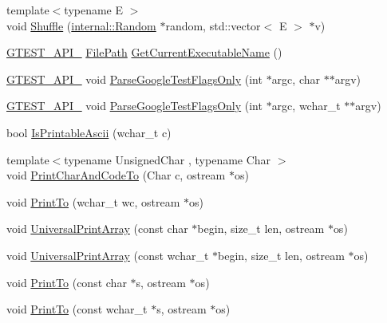\begin{DoxyCompactItemize}
{\footnotesize template$<$typename E $>$ }\\void \hyperlink{namespacetesting_1_1internal_a90d9e6ffe8522a7eb1b2ce9b1a0c4673}{Shuffle} (\hyperlink{classtesting_1_1internal_1_1_random}{internal\+::\+Random} $\ast$random, std\+::vector$<$ E $>$ $\ast$v)
\item 
\hyperlink{gtest-port_8h_aa73be6f0ba4a7456180a94904ce17790}{G\+T\+E\+S\+T\+\_\+\+A\+P\+I\+\_\+} \hyperlink{classtesting_1_1internal_1_1_file_path}{File\+Path} \hyperlink{namespacetesting_1_1internal_a7a2bbf069f75bc99873976ad6fc356ad}{Get\+Current\+Executable\+Name} ()
\item 
\hyperlink{gtest-port_8h_aa73be6f0ba4a7456180a94904ce17790}{G\+T\+E\+S\+T\+\_\+\+A\+P\+I\+\_\+} void \hyperlink{namespacetesting_1_1internal_a472880afbcc592a41e3d623e2dec8412}{Parse\+Google\+Test\+Flags\+Only} (int $\ast$argc, char $\ast$$\ast$argv)
\item 
\hyperlink{gtest-port_8h_aa73be6f0ba4a7456180a94904ce17790}{G\+T\+E\+S\+T\+\_\+\+A\+P\+I\+\_\+} void \hyperlink{namespacetesting_1_1internal_aa3c81a67914856448d0778990d9d9cab}{Parse\+Google\+Test\+Flags\+Only} (int $\ast$argc, wchar\+\_\+t $\ast$$\ast$argv)
\item 
bool \hyperlink{namespacetesting_1_1internal_a744a6dd74c12d1e2c16b3c03e14ed4d4}{Is\+Printable\+Ascii} (wchar\+\_\+t c)
\item 
{\footnotesize template$<$typename Unsigned\+Char , typename Char $>$ }\\void \hyperlink{namespacetesting_1_1internal_a0c577e598e61d339ba45dd6643fb1969}{Print\+Char\+And\+Code\+To} (Char c, ostream $\ast$os)
\item 
void \hyperlink{namespacetesting_1_1internal_aa74ea9d64f76ce69eceb225ca5ebef58}{Print\+To} (wchar\+\_\+t wc, ostream $\ast$os)
\item 
void \hyperlink{namespacetesting_1_1internal_a070107e7a8205ad6ec4d538d52b15b38}{Universal\+Print\+Array} (const char $\ast$begin, size\+\_\+t len, ostream $\ast$os)
\item 
void \hyperlink{namespacetesting_1_1internal_a52394019018eb5079f9f1bcca23dcd60}{Universal\+Print\+Array} (const wchar\+\_\+t $\ast$begin, size\+\_\+t len, ostream $\ast$os)
\item 
void \hyperlink{namespacetesting_1_1internal_adc6c98306d40b53fd07be4e295102a0a}{Print\+To} (const char $\ast$s, ostream $\ast$os)
\item 
void \hyperlink{namespacetesting_1_1internal_afc20fb56b2547a8f91f9ff99650f2024}{Print\+To} (const wchar\+\_\+t $\ast$s, ostream $\ast$os)

\end{DoxyCompactItemize}
